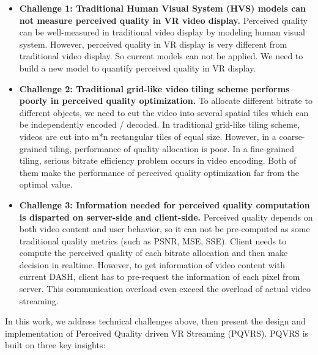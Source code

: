 \begin{itemize}

\item \textbf{Challenge 1: Traditional Human Visual System (HVS) models can not measure perceived quality in VR video display.} Perceived quality can be well-measured in traditional video display by modeling human visual system. However, perceived quality in VR display is very different from traditional video display. So current models can not be applied. We need to build a new model to quantify perceived quality in VR display.

\item \textbf{Challenge 2: Traditional grid-like video tiling scheme performs poorly in perceived quality optimization.} To allocate different bitrate to different objects, we need to cut the video into several spatial tiles which can be independently encoded / decoded. In traditional grid-like tiling scheme, videos are cut into m*n rectangular tiles of equal size. However, in a coarse-grained tiling, performance of quality allocation is poor. In a fine-grained tiling, serious bitrate efficiency problem occurs in video encoding. Both of them make the performance of perceived quality optimization far from the optimal value.

\item \textbf{Challenge 3: Information needed for perceived quality computation is disparted on server-side and client-side.} Perceived quality depends on both video content and user behavior, so it can not be pre-computed as some traditional quality metrics (such as PSNR, MSE, SSE). Client needs to compute the perceived quality of each bitrate allocation and then make decision in realtime. However, to get information of video content with current DASH, client has to pre-request the information of each pixel from server. This communication overload even exceed the overload of actual video streaming.

\end{itemize}

In this work, we address technical challenges above, then present the design and implementation of Perceived Quality driven VR Streaming (PQVRS). PQVRS is built on three key insights:

